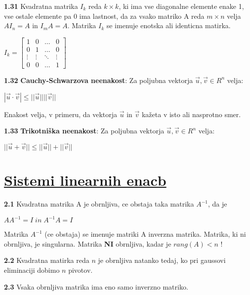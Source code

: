 \documentclass{article}
\begin{document}
\begin{multicols}{2}
	\textbf{1.31} Kvadratna matrika $I_{k}$ reda $k \times k$, ki ima vse diagonalne
	elemente enake 1, vse ostale elemente pa 0 ima lastnost, da za vsako matriko A
	reda $m \times n$ velja $AI_{n} = A$ in $I_{m}A = A$. Matrika $I_{k}$ se imenuje
	enotska ali identicna matirka.
	\begin{center}
		$I_{k}=
			\begin{bmatrix}
				1      & 0      & \hdots & 0      \\
				0      & 1      & \hdots & 0      \\
				\vdots & \vdots & \ddots & \vdots \\
				0      & 0      & \hdots & 1
			\end{bmatrix}
		$
	\end{center}

	\textbf{1.32} \textbf{Cauchy-Schwarzova neenakost}:
	Za poljubna vektorja $\vec{u}, \vec{v} \in R^{n}$ velja:

	\begin{center}
		$|\vec{u} \cdot \vec{v}| \leq ||\vec{u}||||\vec{v}||$
	\end{center}

	Enakost velja, v primeru, da vektorja $\vec{u}$ in $\vec{v}$ kažeta v isto ali nasprotno smer.

	\textbf{1.33} \textbf{Trikotniška neenakost}:
	Za poljubna vektorja $\vec{u}, \vec{v} \in R^{n}$ velja:

	\begin{center}
		$||\vec{u} + \vec{v}|| \leq ||\vec{u}|| + ||\vec{v}||$
	\end{center}

	\section{\underline{Sistemi linearnih enacb}}

	\textbf{2.1} Kvadratna matrika A je obrnljiva, ce obstaja taka matrika
	$A^{-1}$, da je
	\begin{center}
		$AA^{-1} = I\;
			in\;
			A^{-1}A = I
		$
	\end{center}
	Matrika $A^{-1}$ (ce obstaja) se imenuje matriki A inverzna matrika.
	Matrika, ki ni obrnljiva, je singularna. Matrika \textbf{NI} obrnljiva, kadar je
	$rang(A) < n$ !

	\textbf{2.2} Kvadratna matirka reda $n$ je obrnljiva natanko tedaj, ko pri
	gaussovi eliminaciji dobimo $n$ pivotov.

	\textbf{2.3} Vsaka obrnljiva matrika ima eno samo inverzno matriko.


\end{multicols}
\end{document}
